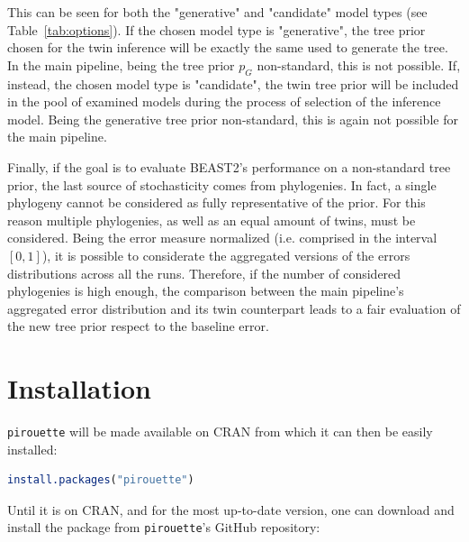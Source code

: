 This can be seen for both the "generative" and "candidate" model types (see Table~\ref{tab:options}).
If the chosen model type is "generative", the tree prior chosen for the twin inference will be exactly the same used to generate the tree.
In the main pipeline, being the tree prior $p_{G}$ non-standard, this is not possible.
If, instead, the chosen model type is "candidate", the twin tree prior will be included in the pool of examined models during the process of selection of the inference model. Being the generative tree prior non-standard, this is again not possible for the main pipeline.

Finally, if the goal is to evaluate BEAST2's performance on a non-standard tree prior, the last source of stochasticity comes from phylogenies. In fact, a single phylogeny cannot be considered as fully representative of the prior. For this reason multiple phylogenies, as well as an equal amount of twins, must be considered. Being the error measure normalized (i.e. comprised in the interval $[0, 1]$), it is possible to considerate the aggregated versions of the errors distributions across all the runs.
Therefore, if the number of considered phylogenies is high enough, the comparison between the main pipeline's aggregated error distribution and its twin counterpart leads to a fair evaluation of the new tree prior respect to the baseline error.

\section{Installation}

\verb;pirouette; will be made available on CRAN from which 
it can then be easily installed:
\begin{lstlisting}[language=R, floatplacement=ht, frame=single]
install.packages("pirouette")
\end{lstlisting}

Until it is on CRAN, and for the most up-to-date version, 
one can download and install the package from \verb;pirouette;'s GitHub 
repository:


